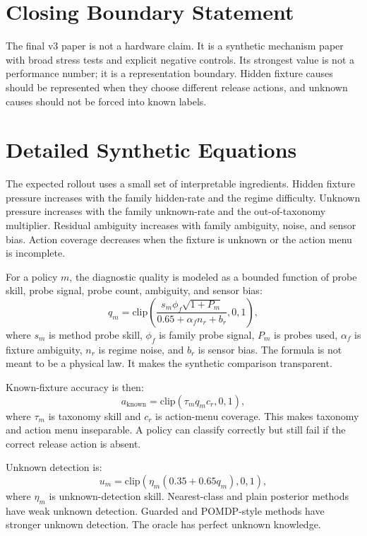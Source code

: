 \documentclass{article}
\begin{document}
\section{Closing Boundary Statement}

The final v3 paper is not a hardware claim. It is a synthetic mechanism paper
with broad stress tests and explicit negative controls. Its strongest value is
not a performance number; it is a representation boundary. Hidden fixture
causes should be represented when they choose different release actions, and
unknown causes should not be forced into known labels.

\section{Detailed Synthetic Equations}

The expected rollout uses a small set of interpretable ingredients. Hidden
fixture pressure increases with the family hidden-rate and the regime
difficulty. Unknown pressure increases with the family unknown-rate and the
out-of-taxonomy multiplier. Residual ambiguity increases with family ambiguity,
noise, and sensor bias. Action coverage decreases when the fixture is unknown
or the action menu is incomplete.

For a policy $m$, the diagnostic quality is modeled as a bounded function of
probe skill, probe signal, probe count, ambiguity, and sensor bias:
\[
q_m =
\mathrm{clip}
\left(
\frac{s_m \phi_f \sqrt{1+P_m}}
{0.65 + \alpha_f n_r + b_r},
0,1
\right),
\]
where $s_m$ is method probe skill, $\phi_f$ is family probe signal, $P_m$ is
probes used, $\alpha_f$ is fixture ambiguity, $n_r$ is regime noise, and $b_r$
is sensor bias. The formula is not meant to be a physical law. It makes the
synthetic comparison transparent.

Known-fixture accuracy is then:
\[
a_{\mathrm{known}} =
\mathrm{clip}
\left(
\tau_m q_m c_r,
0,1
\right),
\]
where $\tau_m$ is taxonomy skill and $c_r$ is action-menu coverage. This makes
taxonomy and action menu inseparable. A policy can classify correctly but still
fail if the correct release action is absent.

Unknown detection is:
\[
u_m =
\mathrm{clip}
\left(
\eta_m(0.35 + 0.65q_m),
0,1
\right),
\]
where $\eta_m$ is unknown-detection skill. Nearest-class and plain posterior
methods have weak unknown detection. Guarded and POMDP-style methods have
stronger unknown detection. The oracle has perfect unknown knowledge.
\end{document}
